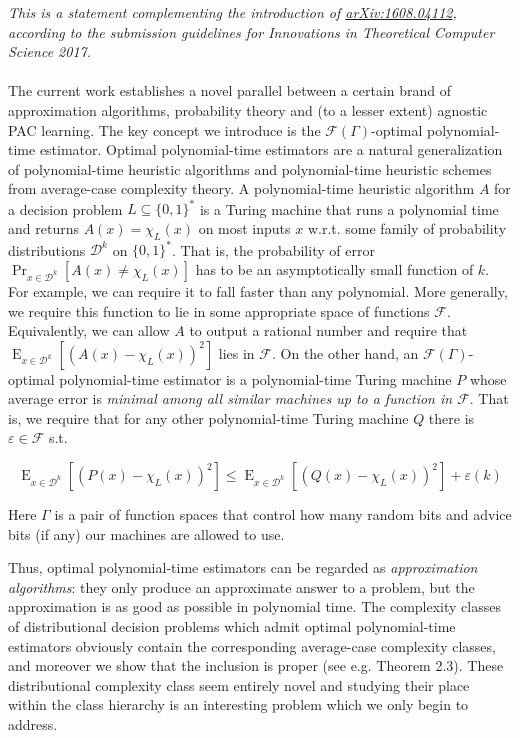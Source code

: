 \documentclass{article}
\numberwithin{equation}{section}
\theoremstyle{definition}
\theoremstyle{plain}
\newcommand{\Bool}{\{0,1\}}
\newcommand{\Words}{{\Bool^*}}
\DeclareMathOperator{\Prb}{Pr}
\DeclareMathOperator{\E}{E}
\newcommand{\Dist}{\mathcal{D}}
\newcommand{\Fall}{\mathcal{F}}
\newcommand{\EG}{\Fall(\Gamma)}
\begin{document}
\emph{This is a statement complementing the introduction of \href{http://arxiv.org/abs/1608.04112}{arXiv:1608.04112}, according to the submission guidelines for Innovations in Theoretical Computer Science 2017.}\\\\
%
The current work establishes a novel parallel between a certain brand of approximation algorithms, probability theory and (to a lesser extent) agnostic PAC learning. The key concept we introduce is the ${\EG}$-optimal polynomial-time estimator. Optimal polynomial-time estimators are a natural generalization of polynomial-time heuristic algorithms and polynomial-time heuristic schemes from average-case complexity theory\cite{Bogdanov_2006}. A polynomial-time heuristic algorithm ${A}$ for a decision problem ${L \subseteq \Words}$ is a Turing machine that runs a polynomial time and returns ${A(x)=\chi_L(x)}$ on most inputs ${x}$ w.r.t. some family of probability distributions ${\Dist^k}$ on ${\Words}$. That is, the probability of error ${\Prb_{x \in \Dist^k}[A(x) \ne \chi_L(x)]}$ has to be an asymptotically small function of ${k}$. For example, we can require it to fall faster than any polynomial. More generally, we require this function to lie in some appropriate space of functions ${\Fall}$. Equivalently, we can allow ${A}$ to output a rational number and require that ${\E_{x \in \Dist^k}[(A(x)-\chi_L(x))^2]}$ lies in ${\Fall}$. On the other hand, an ${\EG}$-optimal polynomial-time estimator is a polynomial-time Turing machine ${P}$ whose average error is \emph{minimal among all similar machines up to a function in ${\Fall}$}. That is, we require that for any other polynomial-time Turing machine ${Q}$ there is ${\varepsilon \in \Fall}$ s.t.

\[\E_{x \in \Dist^k}[(P(x)-\chi_L(x))^2] \leq \E_{x \in \Dist^k}[(Q(x)-\chi_L(x))^2] + \varepsilon(k)\]

Here ${\Gamma}$ is a pair of function spaces that control how many random bits and advice bits (if any) our machines are allowed to use.

Thus, optimal polynomial-time estimators can be regarded as \emph{approximation algorithms}: they only produce an approximate answer to a problem, but the approximation is as good as possible in polynomial time. The complexity classes of distributional decision problems which admit optimal polynomial-time estimators obviously contain the corresponding average-case complexity classes, and moreover we show that the inclusion is proper (see e.g. Theorem 2.3). These distributional complexity class seem entirely novel and studying their place within the class hierarchy is an interesting problem which we only begin to address.
\end{document}
